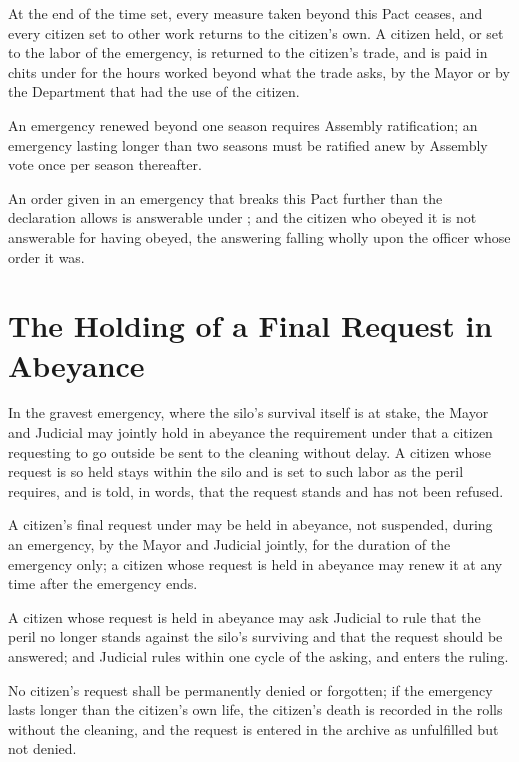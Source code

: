 \begin{clauses}
\item At the end of the time set, every measure taken beyond this Pact ceases, and every citizen set to other work returns to the citizen's own. A citizen held, or set to the labor of the emergency, is returned to the citizen's trade, and is paid in chits under  for the hours worked beyond what the trade asks, by the Mayor or by the Department that had the use of the citizen.
\item An emergency renewed beyond one season requires Assembly ratification; an emergency lasting longer than two seasons must be ratified anew by Assembly vote once per season thereafter.
\item An order given in an emergency that breaks this Pact further than the declaration allows is answerable under ; and the citizen who obeyed it is not answerable for having obeyed, the answering falling wholly upon the officer whose order it was.
\end{clauses}

\section{The Holding of a Final Request in Abeyance}
\label{sec:emergency:holding-of-a-final-request-in-abeyance}

In the gravest emergency, where the silo's survival itself is at stake, the Mayor and Judicial may jointly hold in abeyance the requirement under  that a citizen requesting to go outside be sent to the cleaning without delay. A citizen whose request is so held stays within the silo and is set to such labor as the peril requires, and is told, in words, that the request stands and has not been refused.

\begin{clauses}
\item A citizen's final request under  may be held in abeyance, not suspended, during an emergency, by the Mayor and Judicial jointly, for the duration of the emergency only; a citizen whose request is held in abeyance may renew it at any time after the emergency ends.
\item A citizen whose request is held in abeyance may ask Judicial to rule that the peril no longer stands against the silo's surviving and that the request should be answered; and Judicial rules within one cycle of the asking, and enters the ruling.
\item No citizen's request shall be permanently denied or forgotten; if the emergency lasts longer than the citizen's own life, the citizen's death is recorded in the rolls without the cleaning, and the request is entered in the archive as unfulfilled but not denied.
\end{clauses}

